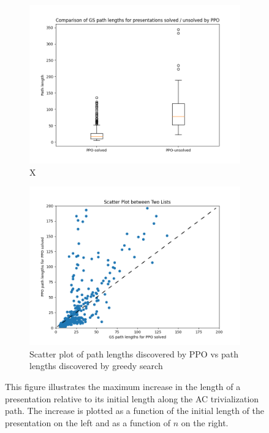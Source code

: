 \begin{figure}
	\centering
	\begin{subfigure}[b]{0.5\textwidth}
		\includegraphics[width=\textwidth]{fig/path_lengths_ppo_solved_vs_unsolved.png}
		\caption{ X}
		\label{fig:path_lengths_ppo_solved_vs_unsolved}
	\end{subfigure}%
	\begin{subfigure}[b]{0.5\textwidth}
		\centering
		\includegraphics[width=1.1\textwidth]{fig/path_lengths_gs_vs_ppo.png}
		\caption{Scatter plot of path lengths discovered by PPO vs path lengths discovered by greedy search}
		\label{fig:path_lengths_gs_vs_ppo}
	\end{subfigure}
	\caption{
This figure illustrates the maximum increase in the length of a presentation relative to its initial length along the AC trivialization path. The increase is plotted as a function of the initial length of the presentation on the left and as a function of $n$ on the right.} \label{fig:path_lengths_gs_vs_ppo_full}
\end{figure}

